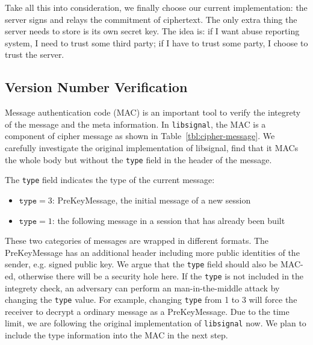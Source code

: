Take all this into consideration, we finally choose our current implementation:
the server signs and relays the commitment of ciphertext.
The only extra thing the server needs to store is its own secret key.
The idea is: if I want abuse reporting system, I need to trust some third party;
if I have to trust some party, I choose to trust the server.

\subsection{Version Number Verification}
\label{sec:version_verify}
Message authentication code (MAC) is an important tool to verify the integrety of the message and the meta information.
In \texttt{libsignal}, the MAC is a component of cipher message as shown in Table~\ref{tbl:cipher-message}.
We carefully investigate the original implementation of libsignal,
find that it MACs the whole body but without the \texttt{type} field in the header of the message.

The \texttt{type} field indicates the type of the current message:
\begin{itemize}
\item $\texttt{type} = 3$: PreKeyMessage, the initial message of a new session
\item $\texttt{type} = 1$: the following message in a session that has already been built 
\end{itemize}
These two categories of messages are wrapped in different formats.
The PreKeyMessage has an additional header including more public identities of the sender,
e.g. signed public key.
We argue that the \texttt{type} field should also be MAC-ed,
otherwise there will be a security hole here.
If the \texttt{type} is not included in the integrety check,
an adversary can perform an man-in-the-middle attack by changing the \texttt{type} value.
For example, changing \texttt{type} from 1 to 3 will force the receiver to decrypt a ordinary message as a PreKeyMessage.
Due to the time limit, we are following the original implementation of \texttt{libsignal} now.
We plan to include the type information into the MAC in the next step.

